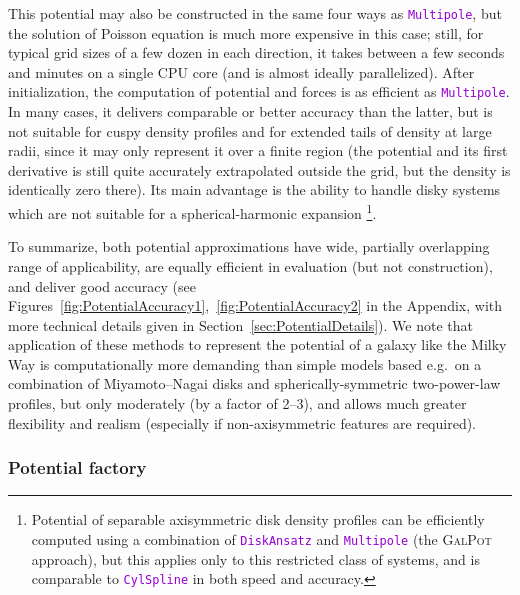 \documentclass[12pt]{article}
\newcommand{\ttt}[1]{\textcolor{darkviolet}{\texttt{#1}}}
\begin{document}
This potential may also be constructed in the same four ways as \ttt{Multipole}, but the solution of Poisson equation is much more expensive in this case; still, for typical grid sizes of a few dozen in each direction, it takes between a few seconds and minutes on a single CPU core (and is almost ideally parallelized). After initialization, the computation of potential and forces is as efficient as \ttt{Multipole}. In many cases, it delivers comparable or better accuracy than the latter, but is not suitable for cuspy density profiles and for extended tails of density at large radii, since it may only represent it over a finite region (the potential and its first derivative is still quite accurately extrapolated outside the grid, but the density is identically zero there). Its main advantage is the ability to handle disky systems which are not suitable for a spherical-harmonic expansion%
\footnote{Potential of separable axisymmetric disk density profiles can be efficiently computed using a combination of \ttt{DiskAnsatz} and \ttt{Multipole} (the \textsc{GalPot} approach), but this applies only to this restricted class of systems, and is comparable to \ttt{CylSpline} in both speed and accuracy.}.

To summarize, both potential approximations have wide, partially overlapping range of applicability, are equally efficient in evaluation (but not construction), and deliver good accuracy (see Figures~\ref{fig:PotentialAccuracy1},~\ref{fig:PotentialAccuracy2} in the Appendix, with more technical details given in Section~\ref{sec:PotentialDetails}).
We note that application of these methods to represent the potential of a galaxy like the Milky Way is computationally more demanding than simple models based e.g.\ on a combination of Miyamoto--Nagai disks and spherically-symmetric two-power-law profiles, but only moderately (by a factor of 2--3), and allows much greater flexibility and realism (especially if non-axisymmetric features are required).

\subsubsection{Potential factory}  \label{sec:PotentialFactory}
\end{document}
